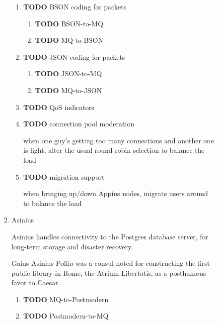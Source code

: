 \documentclass[11pt]{article}
\begin{document}
\begin{enumerate}
\begin{enumerate}
\begin{enumerate}
\begin{enumerate}
\begin{enumerate}
\item {\bfseries\sffamily TODO} BSON coding for packets
\label{sec-5-4-1-4-3-2-5}

\begin{enumerate}
\item {\bfseries\sffamily TODO} BSON-to-MQ
\label{sec-5-4-1-4-3-2-5-1}

\item {\bfseries\sffamily TODO} MQ-to-BSON
\label{sec-5-4-1-4-3-2-5-2}
\end{enumerate}
\item {\bfseries\sffamily TODO} JSON coding for packets
\label{sec-5-4-1-4-3-2-6}

\begin{enumerate}
\item {\bfseries\sffamily TODO} JSON-to-MQ
\label{sec-5-4-1-4-3-2-6-1}

\item {\bfseries\sffamily TODO} MQ-to-JSON
\label{sec-5-4-1-4-3-2-6-2}
\end{enumerate}
\item {\bfseries\sffamily TODO} QoS indicators
\label{sec-5-4-1-4-3-2-7}

\item {\bfseries\sffamily TODO} connection pool moderation
\label{sec-5-4-1-4-3-2-8}

when one guy's getting too many connections and another one is light,
alter the usual round-robin selection to balance the load
\item {\bfseries\sffamily TODO} migration support
\label{sec-5-4-1-4-3-2-9}

when bringing up/down Appius nodes, migrate users around to balance
the load
\end{enumerate}
\item Asinius
\label{sec-5-4-1-4-3-3}

Asinius handles connectivity to the Postgres database server, for
long-term storage and disaster recovery.

Gaius Asinius Pollio was a consul noted for constructing the first
public library in Rome, the Atrium Libertatis, as a posthumous
favor to Caesar.

\begin{enumerate}
\item {\bfseries\sffamily TODO} MQ-to-Postmodern
\label{sec-5-4-1-4-3-3-1}

\item {\bfseries\sffamily TODO} Postmodern-to-MQ
\label{sec-5-4-1-4-3-3-2}


\end{enumerate}
\end{enumerate}
\end{enumerate}
\end{enumerate}
\end{enumerate}
\end{document}
